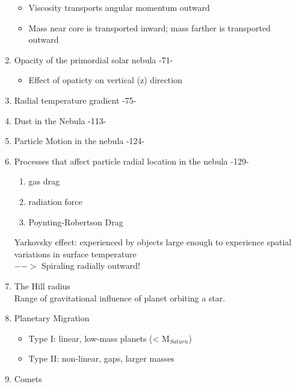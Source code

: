 \documentclass[12pt]{article}
\begin{document}
\begin{enumerate}
\begin{itemize}
            \item Viscosity transports angular momentum outward
            \item Mass near core is transported inward;
                mass farther is transported outward
        \end{itemize}
    \item Opacity of the primordial solar nebula -71-
        \begin{itemize}
            \item Effect of opaticty on vertical (z) direction
        \end{itemize}
    \item Radial temperature gradient -75-
    \item Dust in the Nebula -113-
    \item Particle Motion in the nebula -124-
    \item Processes that affect particle radial location in the nebula -129-
        \begin{enumerate}
            \item gas drag
            \item radiation force
            \item Poynting-Robertson Drag
        \end{enumerate}
    Yarkovsky effect: experienced by objects large enough to
    experience spatial variations in surface temperature \\
    $-->$ Spiraling radially outward!

    \item{The Hill radius} \\
    Range of gravitational influence of planet orbiting a star.
    \item{Planetary Migration} \\
    \begin{itemize}
      \item Type I: linear, low-mass planets (< M$_{Saturn}$)
      \item Type II: non-linear, gaps, larger masses
    \end{itemize}

    \item{Comets}


\end{enumerate}
\end{document}
